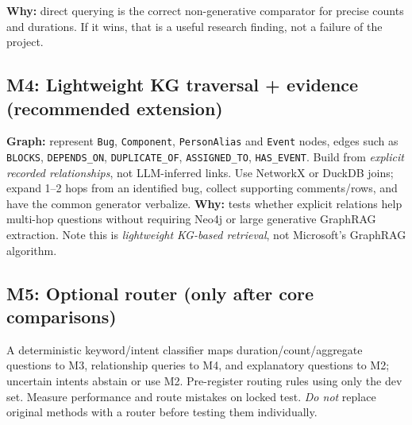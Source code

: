 \documentclass[11pt,a4paper]{article}
\begin{document}
\textbf{Why:} direct querying is the correct non-generative comparator for precise counts and durations. If it wins, that is a useful research finding, not a failure of the project.

\subsection{M4: Lightweight KG traversal + evidence (recommended extension)}
\textbf{Graph:} represent \texttt{Bug}, \texttt{Component}, \texttt{PersonAlias} and \texttt{Event} nodes, edges such as \texttt{BLOCKS}, \texttt{DEPENDS\_ON}, \texttt{DUPLICATE\_OF}, \texttt{ASSIGNED\_TO}, \texttt{HAS\_EVENT}. Build from \emph{explicit recorded relationships}, not LLM-inferred links. Use NetworkX or DuckDB joins; expand 1--2 hops from an identified bug, collect supporting comments/rows, and have the common generator verbalize. \textbf{Why:} tests whether explicit relations help multi-hop questions without requiring Neo4j or large generative GraphRAG extraction. Note this is \emph{lightweight KG-based retrieval}, not Microsoft's GraphRAG algorithm.

\subsection{M5: Optional router (only after core comparisons)}
A deterministic keyword/intent classifier maps duration/count/aggregate questions to M3, relationship queries to M4, and explanatory questions to M2; uncertain intents abstain or use M2. Pre-register routing rules using only the dev set. Measure performance and route mistakes on locked test. \emph{Do not} replace original methods with a router before testing them individually.

\begin{center}
\end{center}
\end{document}
